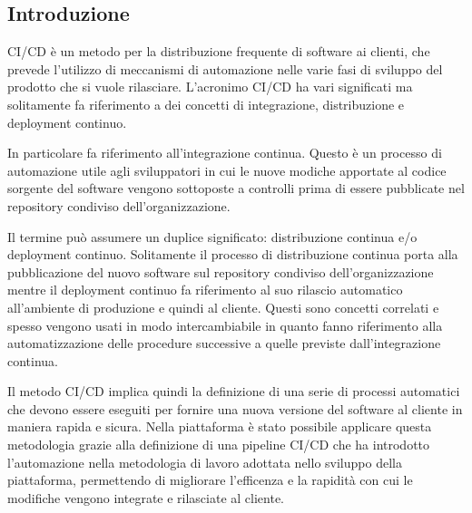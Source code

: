 \subsection{Introduzione}
CI/CD è un metodo per la distribuzione frequente di software ai clienti, che prevede l'utilizzo di meccanismi
di automazione nelle varie fasi di sviluppo del prodotto che si vuole rilasciare.
L'acronimo CI/CD ha vari significati ma solitamente fa riferimento a dei concetti di integrazione, distribuzione
e deployment continuo.

In particolare  fa riferimento all'integrazione continua. Questo è un processo di automazione
utile agli sviluppatori in cui le nuove modiche apportate al codice sorgente del software vengono
sottoposte a controlli prima di essere pubblicate nel repository condiviso dell'organizzazione.

Il termine  può assumere un duplice significato: distribuzione continua e/o deployment continuo.
Solitamente il processo di distribuzione continua porta alla pubblicazione del nuovo software sul repository condiviso dell'organizzazione
mentre il deployment continuo fa riferimento al suo rilascio automatico all'ambiente di produzione e quindi al cliente.
Questi sono concetti correlati e spesso vengono usati in modo intercambiabile in quanto fanno riferimento
alla automatizzazione delle procedure successive a quelle previste dall'integrazione continua.

Il metodo CI/CD implica quindi la definizione di una serie di processi automatici che devono
essere eseguiti per fornire una nuova versione del software al cliente in maniera rapida e sicura.
Nella piattaforma è stato possibile applicare questa metodologia grazie alla definizione di una pipeline CI/CD che ha
introdotto l'automazione nella metodologia di lavoro adottata nello sviluppo
della piattaforma, permettendo di migliorare l'efficenza e la rapidità con cui le modifiche vengono
integrate e rilasciate al cliente.